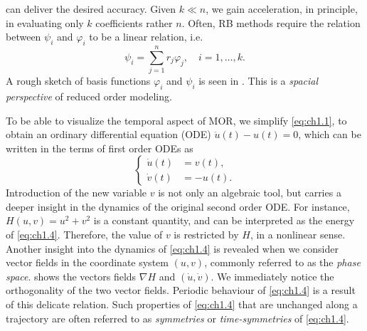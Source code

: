 can deliver the desired accuracy. Given $k \ll n$, we gain acceleration, in principle, in evaluating only $k$ coefficients rather $n$. Often, RB methods require the relation between $\psi_i$ and $\varphi_i$ to be a linear relation, i.e.
\begin{equation} \label{eq:ch1.3.1}
	\psi_i = \sum_{j=1}^n r_j \varphi_j, \quad i=1,\dots,k.
\end{equation}
A rough sketch of basis functions $\varphi_i$ and $\psi_i$ is seen in . This is a \emph{spacial perspective} of reduced order modeling.

To be able to visualize the temporal aspect of MOR, we simplify \eqref{eq:ch1.1}, to obtain an ordinary differential equation (ODE) $\ddot u(t) - u(t) = 0$, which can be written in the terms of first order ODEs as
\begin{equation} \label{eq:ch1.4}
	\left\{
	\begin{aligned}
		\dot u(t) &= v(t), \\
		\dot v(t) &= -u(t).
	\end{aligned}
	\right.
\end{equation}
Introduction of the new variable $v$ is not only an algebraic tool, but carries a deeper insight in the dynamics of the original second order ODE. For instance, $H(u,v) = u^2 + v^2$ is a constant quantity, and can be interpreted as the energy of \eqref{eq:ch1.4}. Therefore, the value of $v$ is restricted by $H$, in a nonlinear sense. Another insight into the dynamics of \eqref{eq:ch1.4} is revealed when we consider vector fields in the coordinate system $(u,v)$, commonly referred to as the \emph{phase space}.  shows the vectors fields $\nabla H$ and $(\dot u, \dot v)$. We immediately notice the orthogonality of the two vector fields. Periodic behaviour of \eqref{eq:ch1.4} is a result of this delicate relation. Such properties of \eqref{eq:ch1.4} that are unchanged along a trajectory are often referred to as \emph{symmetries} or \emph{time-symmetries} of \eqref{eq:ch1.4}.
